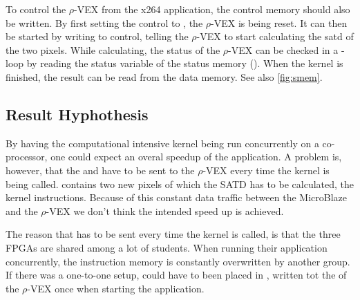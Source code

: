 To control the $\rho$-VEX from the x264 application, the control memory should also be written. By first setting the control to , the $\rho$-VEX is being reset. It can then be started by writing  to control, telling the $\rho$-VEX to start calculating the satd of the two pixels. While calculating, the status of the $\rho$-VEX can be checked in a -loop by reading the status variable of the status memory (). When the  kernel is finished, the result can be read from the data memory. See also \ref{fig:smem}.

\subsection{Result Hyphothesis}

By having the computational intensive kernel being run concurrently on a co-processor, one could expect an overal speedup of the application. A problem is, however, that the  and  have to be sent to the $\rho$-VEX every time the kernel is being called.  contains two new pixels of which the SATD has to be calculated,  the kernel instructions. Because of this constant data traffic between the MicroBlaze and the $\rho$-VEX we don't think the intended speed up is achieved.


The reason that  has to be sent every time the kernel is called, is that the three FPGAs are shared among a lot of students. When running their application concurrently, the instruction memory is constantly overwritten by another group. If there was a one-to-one setup,  could have to been placed in , written tot the  of the $\rho$-VEX once when starting the application. 


